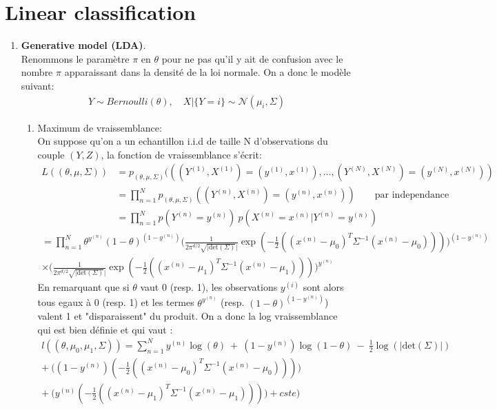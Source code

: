 \documentclass{article}
\begin{document}
\section{Linear classification}
\begin{enumerate}
\item \textbf{Generative model (LDA)}.\\
Renommons le paramètre $\pi$ en $\theta$ pour ne pas qu'il y ait de confusion avec le nombre $\pi$ apparaissant dans la densité de la loi normale. On a donc le modèle suivant:
\begin{align*}
    Y \sim Bernoulli(\theta), \quad X|\{Y=i\} \sim \mathcal{N}(\mu_i,\Sigma)
\end{align*}
\begin{enumerate}[label=(\alph*)]
\item Maximum de vraissemblance:\\
On suppose qu'on a un echantillon i.i.d de taille N d'observations du couple $(Y,Z)$, la fonction de vraissemblance s'écrit:
\begin{align*}
L((\theta,\mu,\Sigma)) &= p_{(\theta,\mu,\Sigma)}(((Y^{(1)},X^{(1)})=(y^{(1)},x^{(1)}),\ldots,(Y^{(N)},X^{(N)})=(y^{(N)},x^{(N)}))\\
&= \prod_{n=1}^{N} p_{(\theta,\mu,\Sigma)}((Y^{(n)},X^{(n)})=(y^{(n)},x^{(n)})) \qquad \text{par independance}\\
&= \prod_{n=1}^{N}p(Y^{(n)}=y^{(n)})\:p(X^{(n)}=x^{(n)}|Y^{(n)}=y^{(n)})
\end{align*}
\begin{multline*}
=\prod_{n=1}^{N}\theta^{y^{(n)}}(1-\theta)^{(1-y^{(n)})}\bigg(\frac{1}{2\pi^{d/2} \sqrt{|\textrm{det}(\Sigma)}|} \exp(-\frac{1}{2}((x^{(n)} - \mu_0)^{T} \Sigma^{-1}(x^{(n)} - \mu_0)))\bigg)^{(1-y^{(n)})}\\
\times\bigg(\frac{1}{2\pi^{d/2} \sqrt{|\textrm{det}(\Sigma)}|} \exp(-\frac{1}{2}((x^{(n)} - \mu_1)^{T} \Sigma^{-1}(x^{(n)} - \mu_1)))\bigg)^{y^{(n)}}
\end{multline*}
En remarquant que si $\theta$ vaut 0 (resp. 1), les observations $y^{(i)}$ sont alors tous egaux à 0 (resp. 1)  et les termes $\theta^{y^{(n)}}$ (resp. $(1-\theta)^{(1-y^{(n)})}$) valent 1 et "disparaissent" du produit. On a donc la log vraissemblance qui est bien définie et qui vaut :
\begin{multline*}
l((\theta,\mu_0,\mu_1,\Sigma)) =\sum_{n=1}^{N}y^{(n)}\log(\theta)\ +\  (1-y^{(n)})\log(1-\theta)\ -\ \frac{1}{2}\log(|\textrm{det}(\Sigma)|)\\ +\  \bigg((1-y^{(n)})(-\frac{1}{2}((x^{(n)} - \mu_0)^{T}  \Sigma^{-1}(x^{(n)} - \mu_0)))\bigg)\\ +\  \bigg(y^{(n)}(-\frac{1}{2}((x^{(n)} - \mu_1)^{T} \Sigma^{-1}(x^{(n)} - \mu_1)))\bigg) + cste)\\
\end{multline*}


\end{enumerate}
\end{enumerate}
\end{document}
